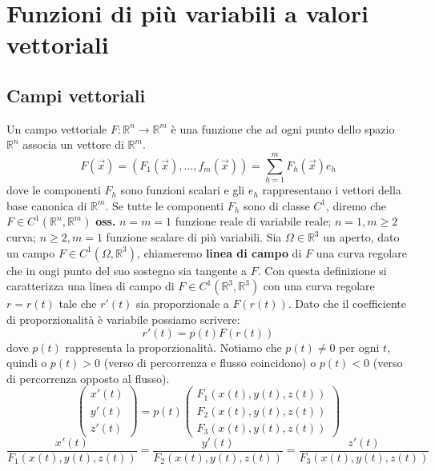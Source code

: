 \section{Funzioni di più variabili a valori vettoriali}
\subsection{Campi vettoriali}
Un campo vettoriale $F: \mathbb{R}^n \rightarrow  \mathbb{R}^m$ è una funzione che ad ogni  punto dello spazio $\mathbb{R}^n$ associa un vettore di $\mathbb{R}^m$.
\[
    F(\vec{x}) = \left(F_1(\vec{x}), \dots, f_m(\vec{x})\right) = \sum_{h=1}^{m} F_h(\vec{x})e_h
\]
dove le componenti $F_h$ sono funzioni scalari e gli $e_h$ rappresentano i vettori della base canonica di $\mathbb{R}^m$. Se tutte le componenti $F_h$ sono di classe $C^1$, diremo che $F \in C^1(\mathbb{R}^n, \mathbb{R}^m)$\newline
\newline
\textbf{oss.} $n=m=1$ funzione reale di variabile reale; $n=1, m \geq 2$ curva; $n \geq 2, m = 1$ funzione scalare di più variabili.\newline
\newline
\newline
Sia $\Omega \in \mathbb{R}^3$ un aperto, dato un campo $F \in C^1(\Omega, \mathbb{R}^3)$, chiameremo \textbf{linea di campo} di $F$ una curva regolare che in ongi punto del suo sostegno sia tangente a $F$.\newline
Con questa definizione si caratterizza una linea di campo di $F \in C^1(\mathbb{R}^3, \mathbb{R}^3)$ con una curva regolare $r = r(t)$ tale che $r'(t)$ sia proporzionale a $F(r(t))$. Dato che il coefficiente di proporzionalità è variabile possiamo scrivere:
\[
    r'(t) = p(t) F(r(t))
\]
dove $p(t)$ rappresenta la proporzionalità. Notiamo che $p(t) \neq 0$ per ogni $t$, quindi o $p(t) > 0$ (verso di percorrenza e flusso coincidono) o $p(t) < 0$ (verso di percorrenza opposto al flusso).
\[
    \left(\begin{matrix}
        x'(t)\\
        y'(t)\\
        z'(t)
    \end{matrix}\right) = p(t) \left(\begin{matrix}
        F_1(x(t),y(t),z(t))\\
        F_2(x(t),y(t),z(t))\\
        F_3(x(t),y(t),z(t))
    \end{matrix}\right)
\]
\[
    \frac{x'(t)}{F_1(x(t),y(t),z(t))} = 
    \frac{y'(t)}{F_2(x(t),y(t),z(t))} = 
    \frac{z'(t)}{F_3(x(t),y(t),z(t))}
\]
